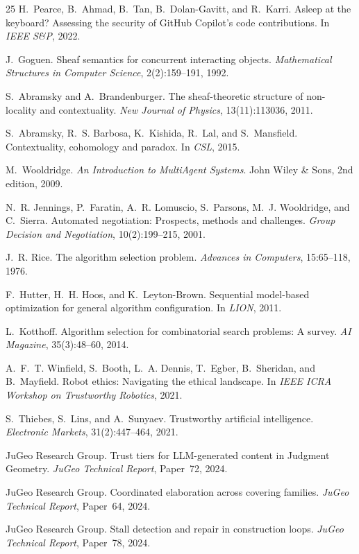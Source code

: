 \documentclass[11pt]{article}
\begin{document}
\begin{thebibliography}{25}
H.~Pearce, B.~Ahmad, B.~Tan, B.~Dolan-Gavitt, and
  R.~Karri.
\newblock Asleep at the keyboard? Assessing the security of
  {GitHub Copilot}'s code contributions.
\newblock In \emph{IEEE S\&P}, 2022.

J.~Goguen.
\newblock Sheaf semantics for concurrent interacting objects.
\newblock \emph{Mathematical Structures in Computer Science},
  2(2):159--191, 1992.

S.~Abramsky and A.~Brandenburger.
\newblock The sheaf-theoretic structure of non-locality and
  contextuality.
\newblock \emph{New Journal of Physics}, 13(11):113036, 2011.

S.~Abramsky, R.~S. Barbosa, K.~Kishida, R.~Lal, and S.~Mansfield.
\newblock Contextuality, cohomology and paradox.
\newblock In \emph{CSL}, 2015.

M.~Wooldridge.
\newblock \emph{An Introduction to MultiAgent Systems}.
\newblock John Wiley \& Sons, 2nd edition, 2009.

N.~R. Jennings, P.~Faratin, A.~R. Lomuscio, S.~Parsons,
  M.~J. Wooldridge, and C.~Sierra.
\newblock Automated negotiation: Prospects, methods and
  challenges.
\newblock \emph{Group Decision and Negotiation},
  10(2):199--215, 2001.

J.~R. Rice.
\newblock The algorithm selection problem.
\newblock \emph{Advances in Computers}, 15:65--118, 1976.

F.~Hutter, H.~H. Hoos, and K.~Leyton-Brown.
\newblock Sequential model-based optimization for general
  algorithm configuration.
\newblock In \emph{LION}, 2011.

L.~Kotthoff.
\newblock Algorithm selection for combinatorial search problems:
  A survey.
\newblock \emph{AI Magazine}, 35(3):48--60, 2014.

A.~F.~T. Winfield, S.~Booth, L.~A. Dennis, T.~Egber,
  B.~Sheridan, and B.~Mayfield.
\newblock Robot ethics: Navigating the ethical landscape.
\newblock In \emph{IEEE ICRA Workshop on Trustworthy Robotics},
  2021.

S.~Thiebes, S.~Lins, and A.~Sunyaev.
\newblock Trustworthy artificial intelligence.
\newblock \emph{Electronic Markets}, 31(2):447--464, 2021.

JuGeo Research Group.
\newblock Trust tiers for LLM-generated content in Judgment
  Geometry.
\newblock \emph{JuGeo Technical Report}, Paper~72, 2024.

JuGeo Research Group.
\newblock Coordinated elaboration across covering families.
\newblock \emph{JuGeo Technical Report}, Paper~64, 2024.

JuGeo Research Group.
\newblock Stall detection and repair in construction loops.
\newblock \emph{JuGeo Technical Report}, Paper~78, 2024.

\end{thebibliography}
\end{document}
